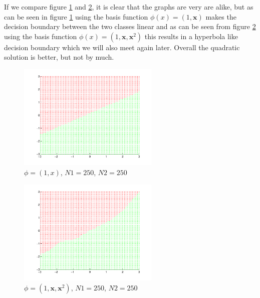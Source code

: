 If we compare figure \ref{fig:q25a} and \ref{fig:q25b}, it is clear
that the graphs are very are alike, but as can be seen in
figure \ref{fig:q25a} using the basis function $\phi(x) =
(1, \mathbf{x})$ makes the decision boundary between the two classes
linear and as can be seen from figure \ref{fig:q25b} using the basis
function $\phi(x) = (1, \mathbf{x}, \mathbf{x}^2)$ this results in a
hyperbola like decision boundary which we will also meet again
later. Overall the quadratic solution is better, but not by much.

\begin{figure}[!htbp]
  \centering
  \includegraphics[width=0.6\textwidth]{./images/q25a.pdf}
  \caption{$\phi = (1,x)$, $N1 = 250$, $N2 = 250$}
  \label{fig:q25a}
\end{figure}

\begin{figure}[!htbp]
  \centering
  \includegraphics[width=0.6\textwidth]{./images/q25b.pdf}
  \caption{$\phi = (1,\mathbf{x}, \mathbf{x}^2)$, $N1 = 250$, $N2 = 250$}
  \label{fig:q25b}
\end{figure}
